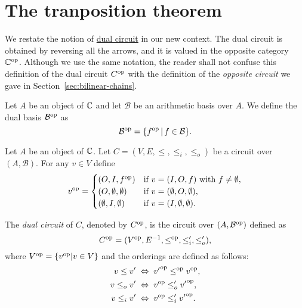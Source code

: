 \section{The tranposition theorem}
\label{sec:tranposition-theorem}
We restate the notion of \hyperref[def:dual]{dual circuit} in our new
context. The dual circuit is obtained by reversing all the arrows, and
it is valued in the opposite category $\mathbb{C}^{\mathrm{op}}$. Although we use the
same notation, the reader shall not confuse this definition of the
dual circuit $C^{\mathrm{op}}$ with the definition of the \emph{opposite
  circuit} we gave in Section~\ref{sec:bilinear-chains}.

\begin{definition}
  Let $A$ be an object of $\mathbb{C}$ and let $\mathcal{B}$ be an arithmetic
  basis over $A$. We define the dual basis $\mathcal{B}^{\mathrm{op}}$ as
  \begin{equation}
    \mathcal{B}^{\mathrm{op}}= \{f^{\mathrm{op}} \,|\, f\in\mathcal{B}\}
    \text{.}
  \end{equation}
\end{definition}

\begin{definition}
   Let $A$ be an object of $\mathbb{C}$. Let
  ${C=(V,E,\le,\le_i,\le_o)}$ be a circuit over $(A,\mathcal{B})$. For
  any $v\in V$ define
  \begin{equation}
    v^{\mathrm{op}} =
    \begin{cases}
    (O,I,f^{\mathrm{op}})              &\text{if $v=(I,O,f)$ with $f\ne\emptyset$,}\\
    (O,\emptyset,\emptyset) &\text{if $v=(\emptyset,O,\emptyset)$,}\\
    (\emptyset,I,\emptyset) &\text{if $v=(I,\emptyset,\emptyset)$.}
    \end{cases}
  \end{equation}

  The \emph{dual circuit} of $C$, denoted by $C^{\mathrm{op}}$, is the circuit
  over $(A,\mathcal{B}^{\mathrm{op}})$ defined as
  \[C^{\mathrm{op}} = (V^{\mathrm{op}}, E^{-1},\le^{\mathrm{op}},\le_i',\le_o')\text{,}\]
  where $V^{\mathrm{op}}=\{v^{\mathrm{op}}|v\in V\}$ and the orderings are defined
  as follows:
  \begin{align}
    v \le v' \;&\Leftrightarrow\; {v'}^{\mathrm{op}} \le^{\mathrm{op}} {v}^{\mathrm{op}}\text{,}\\
    v \le_o v' \;&\Leftrightarrow\; {v}^{\mathrm{op}} \le_o' {v'}^{\mathrm{op}}\text{,}\\
    v \le_i v' \;&\Leftrightarrow\; {v}^{\mathrm{op}} \le_i' {v'}^{\mathrm{op}}\text{.}
  \end{align}
\end{definition}


